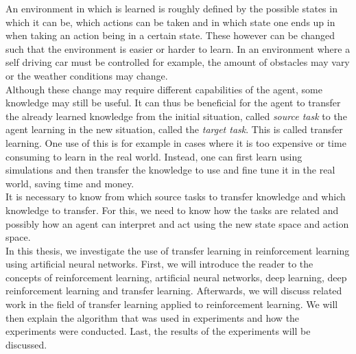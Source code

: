 An environment in which is learned is roughly defined by the possible states in which it can be, which actions can be taken and in which state one ends up in when taking an action being in a certain state.
These however can be changed such that the environment is easier or harder to learn.
In an environment where a self driving car must be controlled for example, the amount of obstacles may vary or the weather conditions may change.\\
Although these change may require different capabilities of the agent, some knowledge may still be useful.
It can thus be beneficial for the agent to transfer the already learned knowledge from the initial situation, called \textit{source task} to the agent learning in the new situation, called the \textit{target task}.
This is called transfer learning. One use of this is for example in cases where it is too expensive or time consuming to learn in the real world. Instead, one can first learn using simulations and then transfer the knowledge to use and fine tune it in the real world, saving time and money.\\
It is necessary to know from which source tasks to transfer knowledge and which knowledge to transfer.
For this, we need to know how the tasks are related and possibly how an agent can interpret and act using the new state space and action space.\\

In this thesis, we investigate the use of transfer learning in reinforcement learning using artificial neural networks.
First, we will introduce the reader to the concepts of reinforcement learning, artificial neural networks, deep learning, deep reinforcement learning and transfer learning.
Afterwards, we will discuss related work in the field of transfer learning applied to reinforcement learning.
We will then explain the algorithm that was used in experiments and how the experiments were conducted.
Last, the results of the experiments will be discussed.
